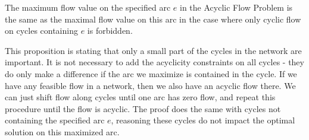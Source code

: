 \begin{prop}
  The maximum flow value on the specified arc $e$ in the Acyclic Flow Problem is the same as the 
  maximal flow value on this arc in the case where only cyclic flow on cycles containing $e$ is forbidden. 
\end{prop}
This proposition is stating that only a small part of the cycles in the network are important. It is not necessary 
to add the acyclicity constraints on all cycles - they do only make a difference if the arc we maximize is contained in 
the cycle. If we have any feasible flow in a network, then we also have an acyclic flow there. We can just shift flow 
along cycles until one arc has zero flow, and repeat this procedure until the flow is acyclic. The proof does the same 
with cycles not containing the specified arc $e$, reasoning these cycles do not impact the optimal solution on this
maximized arc.

